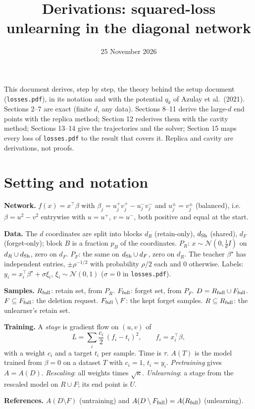 \documentclass[10pt]{article}
\title{Derivations: squared-loss unlearning in the diagonal network}
\author{}\date{25 November 2026}
\newcommand{\bs}{\beta^\star}\newcommand{\E}{\mathbb E}\newcommand{\asinh}{\operatorname{arcsinh}}\newcommand{\sk}{\sqrt k}
\newcommand{\Rf}{R_{\rm full}}\newcommand{\Ff}{F_{\rm full}}\newcommand{\dSh}{d_{\rm Sh}}
\begin{document}
\maketitle

This document derives, step by step, the theory behind the setup document (\texttt{losses.pdf}), in its notation and with the potential $q_k$ of Azulay et al.\ (2021). Sections 2--7 are exact (finite $d$, any data). Sections 8--11 derive the large-$d$ end points with the replica method; Section 12 rederives them with the cavity method; Sections 13--14 give the trajectories and the solver; Section 15 maps every loss of \texttt{losses.pdf} to the result that covers it. Replica and cavity are derivations, not proofs.

\section{Setting and notation}
\textbf{Network.} $f(x)=x^\top\beta$ with $\beta_j=u_j^+v_j^+-u_j^-v_j^-$ and $u_j^\pm=v_j^\pm$ (balanced), i.e.\ $\beta=u^2-v^2$ entrywise with $u=u^+$, $v=u^-$, both positive and equal at the start.

\textbf{Data.} The $d$ coordinates are split into blocks $d_R$ (retain-only), $\dSh$ (shared), $d_F$ (forget-only); block $B$ is a fraction $p_B$ of the coordinates. $P_R$: $x\sim\mathcal N(0,\frac1dI)$ on $d_R\cup\dSh$, zero on $d_F$. $P_F$: the same on $\dSh\cup d_F$, zero on $d_R$. The teacher $\bs$ has independent entries, $\pm\rho^{-1/2}$ with probability $\rho/2$ each and $0$ otherwise. Labels: $y_i=x_i^\top\bs+\sigma\xi_i$, $\xi_i\sim\mathcal N(0,1)$ ($\sigma=0$ in \texttt{losses.pdf}).

\textbf{Samples.} $\Rf$: retain set, from $P_R$. $\Ff$: forget set, from $P_F$. $D=\Rf\cup\Ff$. $F\subseteq\Ff$: the deletion request. $\Ff\setminus F$: the kept forget samples. $R\subseteq\Rf$: the unlearner's retain set.

\textbf{Training.} A \emph{stage} is gradient flow on $(u,v)$ of
\[
L=\sum_i\frac{c_i}2\,(f_i-t_i)^2,\qquad f_i=x_i^\top\beta ,
\]
with a weight $c_i$ and a target $t_i$ per sample. Time is $\tau$. $A(T)$ is the model trained from $\beta=0$ on a dataset $T$ with $c_i=1$, $t_i=y_i$. \emph{Pretraining} gives $A=A(D)$. \emph{Rescaling}: all weights times $\sqrt\kappa$. \emph{Unlearning}: a stage from the rescaled model on $R\cup F$; its end point is $U$.

\textbf{References.} $A(D\setminus F)$ (untraining) and $A(D\setminus\Ff)=A(\Rf)$ (unlearning).
\end{document}
